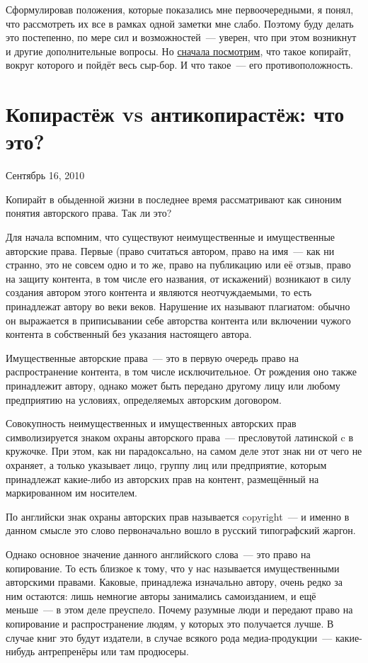 Сформулировав положения, которые показались мне первоочередными, я понял, что рассмотреть их все в рамках одной заметки мне слабо. Поэтому буду делать это постепенно, по мере сил и возможностей~--- уверен, что при этом возникнут и другие дополнительные вопросы. Но \href{http://alv.me/?p=1174}{сначала посмотрим}, что такое копирайт, вокруг которого и пойдёт весь сыр-бор. И что такое~--- его противоположность.

\section{Копирастёж vs антикопирастёж: что это?}
\begin{timeline}Сентябрь 16, 2010\end{timeline}

Копирайт в обыденной жизни в последнее время рассматривают как синоним понятия авторского права. Так ли это?

Для начала вспомним, что существуют неимущественные и имущественные авторские права. Первые (право считаться автором, право на имя~--- как ни странно, это не совсем одно и то же, право на публикацию или её отзыв, право на защиту контента, в том числе его названия, от искажений) возникают в силу создания автором этого контента и являются неотчуждаемыми, то есть принадлежат автору во веки веков. Нарушение их называют плагиатом: обычно он выражается в приписывании себе авторства контента или включении чужого контента в собственный без указания настоящего автора.

Имущественные авторские права~--- это в первую очередь право на распространение контента, в том числе исключительное. От рождения оно также принадлежит автору, однако может быть передано другому лицу или любому предприятию на условиях, определяемых авторским договором.

Совокупность неимущественных и имущественных авторских прав символизируется знаком охраны авторского права~--- пресловутой латинской c в кружочке. При этом, как ни парадоксально, на самом деле этот знак ни от чего не охраняет, а только указывает лицо, группу лиц или предприятие, которым принадлежат какие-либо из авторских прав на контент, размещённый на маркированном им носителем.

По английски знак охраны авторских прав называется copyright~--- и именно в данном смысле это слово первоначально вошло в русский типографский жаргон.

Однако основное значение данного английского слова~--- это право на копирование. То есть близкое к тому, что у нас называется имущественными авторскими правами. Каковые, принадлежа изначально автору, очень редко за ним остаются: лишь немногие авторы занимались самоизданием, и ещё меньше~--- в этом деле преуспело. Почему разумные люди и передают право на копирование и распространение людям, у которых это получается лучше. В случае книг это будут издатели, в случае всякого рода медиа-продукции~--- какие-нибудь антрепренёры или там продюсеры.

